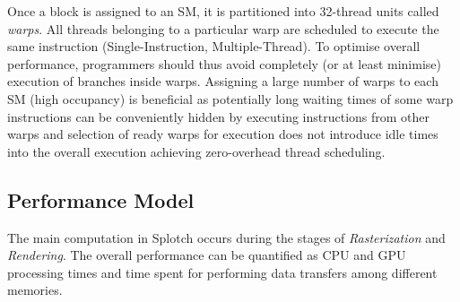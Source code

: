 \documentclass[preprint,5pt]{elsarticle}
\begin{document}
Once a block is assigned to an SM, it is partitioned into 32-thread units called {\em warps}. All threads belonging to a particular warp are scheduled to execute the same instruction (Single-Instruction, Multiple-Thread). To optimise overall performance, programmers should thus avoid completely (or at least minimise) execution of branches inside warps. Assigning a large number of warps to each SM (high occupancy) is beneficial as potentially long waiting times of some warp instructions can be conveniently hidden by executing instructions from other warps and selection of ready warps for execution does not introduce idle times into the overall execution achieving zero-overhead thread scheduling. 

\subsection{Performance Model}
\label{sec:model}

The main computation in Splotch occurs during the stages of {\it Rasterization} and {\it Rendering}.
The overall performance can be quantified as CPU and GPU processing times 
and time spent for performing data transfers among different memories.
\end{document}
